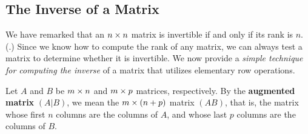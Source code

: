 \subsection{The Inverse of a Matrix}
We have remarked that an \(n \times n\) matrix is invertible if and only if its rank is \(n\). (.)
Since we know how to compute the rank of any matrix, we can always test a matrix to determine whether it is invertible.
We now provide a \emph{simple technique for computing the inverse} of a matrix that utilizes elementary row
operations.

\begin{definition} \label{def 3.4}
Let \(A\) and \(B\) be \(m \times n\) and \(m \times p\) matrices, respectively.
By the \textbf{augmented matrix} \((A|B)\), we mean the \(m \times (n + p)\) matrix \((A B)\),
that is, the matrix whose first \(n\) columns are the columns of \(A\), and whose last \(p\) columns are the columns of \(B\).
\end{definition}

